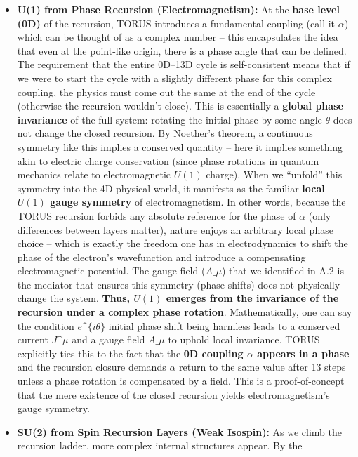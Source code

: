 \documentclass[]{article}
\begin{document}
\begin{itemize}
\item
  \textbf{U(1) from Phase Recursion (Electromagnetism):} At the
  \textbf{base level (0D)} of the recursion, TORUS introduces a
  fundamental coupling (call it $\alpha$) which can be
  thought of as a complex number -- this encapsulates the idea that even
  at the point-like origin, there is a phase angle that can be defined.
  The requirement that the entire 0D--13D cycle is self-consistent means
  that if we were to start the cycle with a slightly different phase for
  this complex coupling, the physics must come out the same at the end
  of the cycle (otherwise the recursion wouldn't close)​. This is
  essentially a \textbf{global phase invariance} of the full system:
  rotating the initial phase by some angle $\theta$
  does not change the closed recursion. By Noether's theorem, a
  continuous symmetry like this implies a conserved quantity -- here it
  implies something akin to electric charge conservation (since phase
  rotations in quantum mechanics relate to electromagnetic $U(1)$
  charge). When we ``unfold'' this symmetry into the 4D physical world,
  it manifests as the familiar \textbf{local $U(1)$ gauge symmetry} of
  electromagnetism​. In other words, because the TORUS recursion forbids
  any absolute reference for the phase of $\alpha$
  (only differences between layers matter), nature enjoys an arbitrary
  local phase choice -- which is exactly the freedom one has in
  electrodynamics to shift the phase of the electron's wavefunction and
  introduce a compensating electromagnetic potential. The gauge field
  ($A\_\mu$) that we identified in A.2 is the mediator
  that ensures this symmetry (phase shifts) does not physically change
  the system. \textbf{Thus, $U(1)$ emerges from the invariance of the
  recursion under a complex phase rotation}. Mathematically, one can say
  the condition $e\^{}\{i\theta\}$ initial phase shift
  being harmless leads to a conserved current
  $J\^{}\mu$ and a gauge field
  $A\_\mu$ to uphold local invariance. TORUS explicitly
  ties this to the fact that the \textbf{0D coupling
  $\alpha$ appears in a phase} and the recursion
  closure demands $\alpha$ return to the same value
  after 13 steps unless a phase rotation is compensated by a field​.
  This is a proof-of-concept that the mere existence of the closed
  recursion yields electromagnetism's gauge symmetry.
\item
  \textbf{SU(2) from Spin Recursion Layers (Weak Isospin):} As we climb
  the recursion ladder, more complex internal structures appear. By the

\end{itemize}
\end{document}
